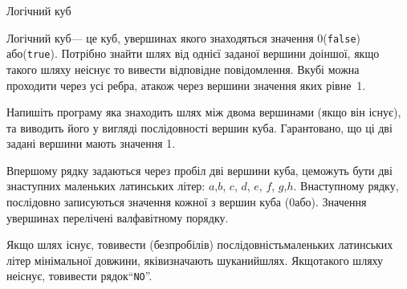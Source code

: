 \documentclass[14pt,a4paper]{extarticle}
\begin{document}
\begin{problemAllDefault}{Логічний куб}

Логічний куб\nolinebreak[3] --- це куб, у\nolinebreak[3] вершинах якого знаходяться значення 0\nolinebreak[3] (\texttt{false}) або\nolinebreak[3] (\texttt{true}). Потрібно знайти шлях від однієї заданої вершини до\nolinebreak[2] іншої, якщо такого шляху не\nolinebreak[3] існує то вивести відповідне повідомлення. В\nolinebreak[3] кубі можна проходити через усі ребра, а\nolinebreak[3] також через вершини значення яких рівне~1.

Напишіть програму яка знаходить шлях між двома вершинами (якщо він існує), та виводить його у вигляді послідовності вершин куба. Гарантовано, що ці дві задані вершини мають значення 1.

\InputFile
В\nolinebreak[3] першому рядку задаються через пробіл дві вершини куба, це\nolinebreak[1] можуть бути дві з\nolinebreak[3] наступних маленьких латинських літер: $a$,\nolinebreak[3] $b$, $c$, $d$, $e$, $f$, $g$,\nolinebreak[3] $h$. В\nolinebreak[3] наступному рядку, послідовно записуються значення кожної з вершин куба (0\nolinebreak[2] або). Значення у\nolinebreak[2] вершинах перелічені в\nolinebreak[2] алфавітному порядку.

\OutputFile
Якщо шлях існує, то\nolinebreak[2] вивести (без\nolinebreak[2] пробілів) послідовність\linebreak[1] маленьких латинських літер мінімальної довжини, які\nolinebreak[2] визначають шуканий\nolinebreak[2] шлях. Якщо\nolinebreak[2] такого шляху не\nolinebreak[3] існує, то\nolinebreak[2] вивести рядок\nolinebreak[3] ``\texttt{NO}''.

\Examples
\begin{exampleSimple}{3em}{3em}%
%
%
\end{exampleSimple}

\end{problemAllDefault}
\end{document}
